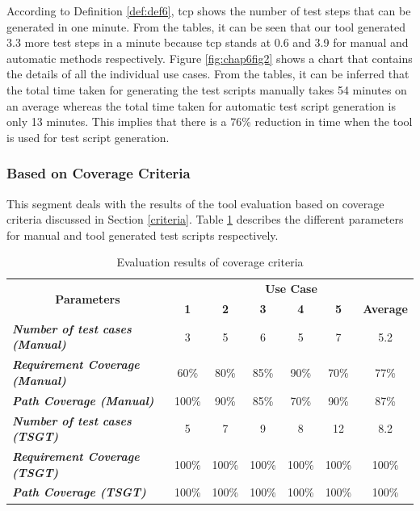 According to Definition \ref{def:def6}, \gls{tcp} shows the number of test steps that can be generated in one minute. From the tables, it can be seen that our tool generated 3.3 more test steps in a minute because \gls{tcp} stands at 0.6 and 3.9 for manual and automatic methods respectively. Figure \ref{fig:chap6fig2} shows a chart that contains the details of all the individual use cases.
From the tables, it can be inferred that the total time taken for generating the test scripts manually takes 54 minutes on an average whereas the total time taken for automatic test script generation is only 13 minutes. This implies that there is a 76\% reduction in time when the tool is used for test script generation.

\subsubsection{Based on Coverage Criteria}

This segment deals with the results of the tool evaluation based on coverage criteria discussed in Section \ref{criteria}. Table \ref{tab:coverageresults} describes the different parameters for manual and tool generated test scripts respectively.
\begin{table}[htbp]
  \centering
  \caption{Evaluation results of coverage criteria}
  	\begin{adjustbox}{width=1\textwidth}
    \begin{tabular}{|l|c|c|c|c|c|c|}
    \toprule
    \multicolumn{1}{|c|}{\multirow{2}[4]{*}{\textbf{Parameters}}} & \multicolumn{6}{c|}{\textbf{Use Case }} \\
\cmidrule{2-7}          & \textbf{1} & \textbf{2} & \textbf{3} & \textbf{4} & \textbf{5} & \textbf{Average} \\
    \midrule
    \textit{\textbf{Number of test cases (Manual)}} & 3     & 5     & 6     & 5     & 7     & 5.2 \\
    \midrule
    \textit{\textbf{Requirement Coverage  (Manual)}} & 60\%  & 80\%  & 85\%  & 90\%  & 70\%  & 77\% \\
    \midrule
    \textit{\textbf{Path Coverage  (Manual)}} & 100\% & 90\%  & 85\%  & 70\%  & 90\%  & 87\% \\
    \midrule
    \textit{\textbf{Number of test cases  (TSGT)}} & 5     & 7     & 9     & 8     & 12    & 8.2 \\
    \midrule
    \textit{\textbf{Requirement Coverage (TSGT)}} & 100\% & 100\% & 100\% & 100\% & 100\% & 100\% \\
    \midrule
    \textit{\textbf{Path Coverage (TSGT)}} & 100\% & 100\% & 100\% & 100\% & 100\% & 100\% \\
    \bottomrule
    \end{tabular}%
    \end{adjustbox}
  \label{tab:coverageresults}%
\end{table}%

